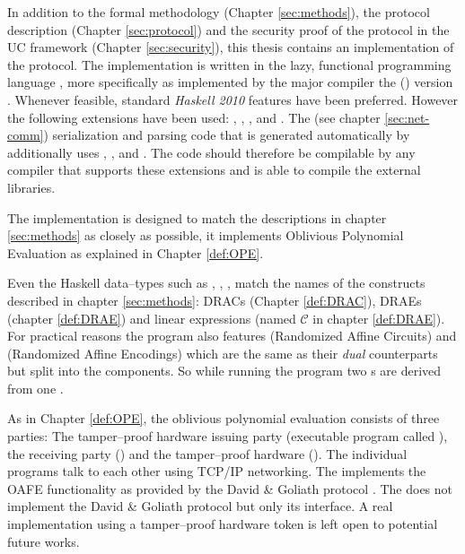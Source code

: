 \label{sec:implementation}

In addition to the formal methodology (Chapter \ref{sec:methods}), the protocol
description (Chapter \ref{sec:protocol}) and the security proof of the protocol
in the UC framework (Chapter \ref{sec:security}), this thesis contains an
implementation of the protocol. The implementation is written in the lazy,
functional programming language \JWTLhaskell{}, more specifically \JWThaskell{}
as implemented by the major \JWThaskell{} compiler the \JWTXLghc{} (\JWTghc{})
version \JWTVghc{}. Whenever feasible, standard \emph{Haskell 2010}
\cite{haskell2010} features have been preferred. However the following
extensions have been used: ,
, , and
.  The \JWTprotobuf{} (see chapter
\ref{sec:net-comm}) serialization and parsing code that is generated
automatically by  additionally uses
, , and
. The code should therefore be compilable
by any \JWThaskell{} compiler that supports these extensions and is able to
compile the external libraries.

The implementation is designed to match the descriptions in chapter
\ref{sec:methods} as closely as possible, it implements Oblivious Polynomial
Evaluation as explained in Chapter \ref{def:OPE}.

Even the Haskell data--types such as , , ,
 match the names of the constructs described in chapter
\ref{sec:methods}: DRACs (Chapter \ref{def:DRAC}), DRAEs (chapter
\ref{def:DRAE}) and linear expressions (named $\mathcal{C}$ in chapter
\ref{def:DRAE}). For practical reasons the program also features 
(Randomized Affine Circuits) and  (Randomized Affine Encodings)
which are the same as their \emph{dual} counterparts but split into the
components. So while running the program two s are derived from one
.

As in Chapter \ref{def:OPE}, the oblivious polynomial evaluation consists of
three parties: The tamper--proof hardware issuing party \JWpOne{} (executable
program called \JWBpOne{}), the receiving party \JWpTwo{} (\JWBpTwo{}) and the
tamper--proof hardware \JWtoken{} (\JWBtoken{}). The individual programs talk to
each other using TCP/IP networking. The \JWtoken{} implements the OAFE
functionality  as provided by the David \& Goliath
protocol \cite{davidgoliath}. The \JWtoken{} does not implement the
David \& Goliath protocol but only its interface. A real implementation using a
tamper--proof hardware token is left open to potential future works.


